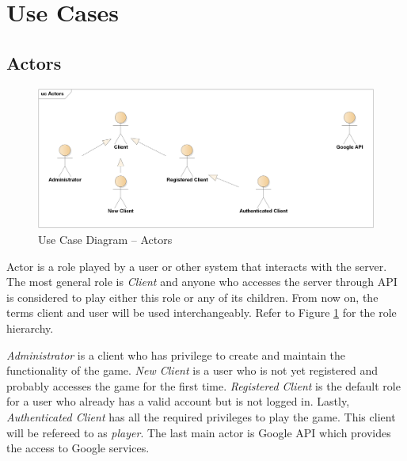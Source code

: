 \section{Use Cases}
	\subsection{Actors}
		\begin{figure}[h]	
			\includegraphics[width=\textwidth]{figures/UC_Actors}
			\centering			
			\caption{Use Case
				 Diagram -- Actors}
			\label{fig:ucactors}
		\end{figure}
		\noindent Actor is a role played by a user or other system that interacts with the server. The most general role is \textit{Client} and anyone who accesses the server through API is considered to play either this role or any of its children. From now on, the terms client and user will be used interchangeably. Refer to Figure \ref{fig:ucactors} for the role hierarchy.
		
		\textit{Administrator} is a client who has privilege to create and maintain the functionality of the game. \textit{New Client} is a user who is not yet registered and probably accesses the game for the first time. \textit{Registered Client} is the default role for a user who already has a valid account but is not logged in. Lastly, \textit{Authenticated Client} has all the required privileges to play the game. This client will be refereed to as \textit{player}. The last main actor is Google API which provides the access to Google services. 		

